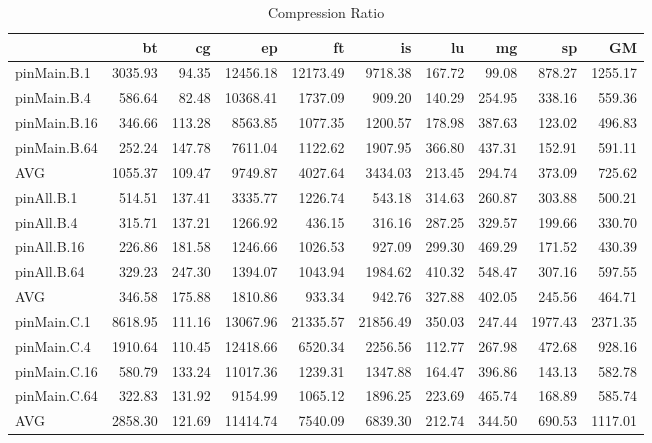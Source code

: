 \iffalse
\begin{table*}[]
\caption{Compression Ratio}
\label{comet_cr_pMpA_BC_itn_p3.5}\begin{center}
\begin{tabular}{lrrrrrrrrr}
\hline
              &      bt &     cg &       ep &       ft &       is &     lu &     mg &      sp &      GM \\
\hline
 pinMain.B.1  & 3035.93 &  94.35 & 12456.18 & 12173.49 &  9718.38 & 167.72 &  99.08 &  878.27 & 1255.17 \\
 pinMain.B.4  &  586.64 &  82.48 & 10368.41 &  1737.09 &   909.20 & 140.29 & 254.95 &  338.16 &  559.36 \\
 pinMain.B.16 &  346.66 & 113.28 &  8563.85 &  1077.35 &  1200.57 & 178.98 & 387.63 &  123.02 &  496.83 \\
 pinMain.B.64 &  252.24 & 147.78 &  7611.04 &  1122.62 &  1907.95 & 366.80 & 437.31 &  152.91 &  591.11 \\
 AVG          & 1055.37 & 109.47 &  9749.87 &  4027.64 &  3434.03 & 213.45 & 294.74 &  373.09 &  725.62 \\
 pinAll.B.1   &  514.51 & 137.41 &  3335.77 &  1226.74 &   543.18 & 314.63 & 260.87 &  303.88 &  500.21 \\
 pinAll.B.4   &  315.71 & 137.21 &  1266.92 &   436.15 &   316.16 & 287.25 & 329.57 &  199.66 &  330.70 \\
 pinAll.B.16  &  226.86 & 181.58 &  1246.66 &  1026.53 &   927.09 & 299.30 & 469.29 &  171.52 &  430.39 \\
 pinAll.B.64  &  329.23 & 247.30 &  1394.07 &  1043.94 &  1984.62 & 410.32 & 548.47 &  307.16 &  597.55 \\
 AVG          &  346.58 & 175.88 &  1810.86 &   933.34 &   942.76 & 327.88 & 402.05 &  245.56 &  464.71 \\
 pinMain.C.1  & 8618.95 & 111.16 & 13067.96 & 21335.57 & 21856.49 & 350.03 & 247.44 & 1977.43 & 2371.35 \\
 pinMain.C.4  & 1910.64 & 110.45 & 12418.66 &  6520.34 &  2256.56 & 112.77 & 267.98 &  472.68 &  928.16 \\
 pinMain.C.16 &  580.79 & 133.24 & 11017.36 &  1239.31 &  1347.88 & 164.47 & 396.86 &  143.13 &  582.78 \\
 pinMain.C.64 &  322.83 & 131.92 &  9154.99 &  1065.12 &  1896.25 & 223.69 & 465.74 &  168.89 &  585.74 \\
 AVG          & 2858.30 & 121.69 & 11414.74 &  7540.09 &  6839.30 & 212.74 & 344.50 &  690.53 & 1117.01 \\

\end{tabular}
\end{center}
\end{table*}
